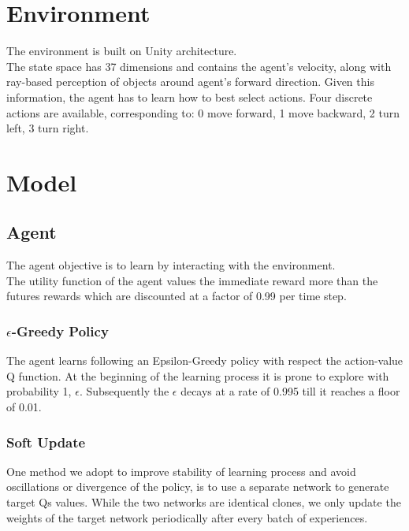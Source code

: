 \documentclass[pagenumber=off]{article}
\begin{document}


\section{Environment}
The environment is built on Unity architecture.\\
The state space has 37 dimensions and contains the agent's velocity, along with ray-based perception of objects around agent's forward direction. Given this information, the agent has to learn how to best select actions. Four discrete actions are available, corresponding to: 0 move forward, 1 move backward, 2 turn left, 3 turn right.


\section{Model}


\subsection{Agent}

The agent objective is to learn by interacting with the environment.\\
The utility function of the agent values the immediate reward more than the futures rewards which are discounted at a factor of 0.99 per time step.


\subsubsection{{\Large $\epsilon$}-Greedy Policy}

The agent learns following an Epsilon-Greedy policy with respect the action-value Q function.
At the beginning of the learning process it is prone to explore with probability 1, $\epsilon$.
Subsequently the $\epsilon$ decays at a rate of 0.995 till it reaches a floor of 0.01.


\subsubsection{Soft Update}

One method we adopt to improve stability of learning process and avoid oscillations or divergence of the policy, is to use a separate network to generate target Qs values. While the two networks are identical clones, we only update the weights of the target network periodically after every batch of experiences.
\end{document}
